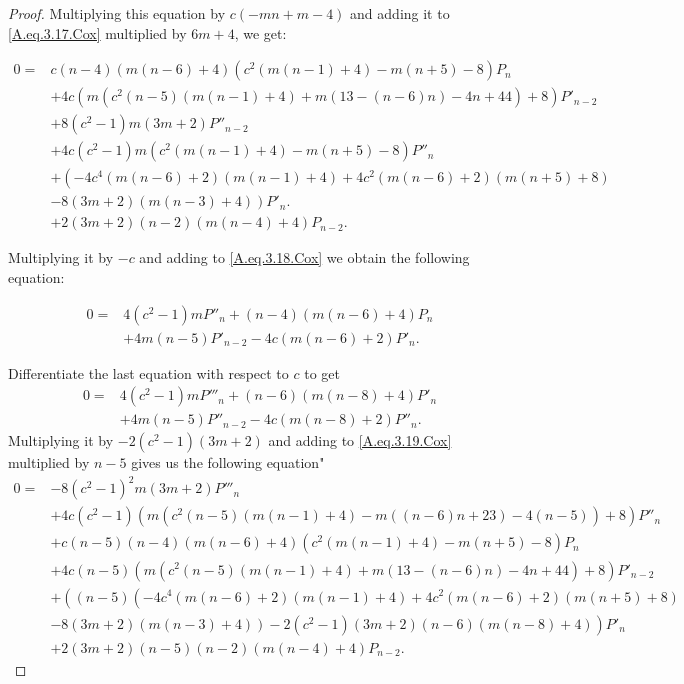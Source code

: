 \documentclass[review,nopreprintline]{elsarticle}
\theoremstyle{definition}
\numberwithin{equation}{section}
\theoremstyle{remark}
\begin{document}
\begin{proof}
	       Multiplying this equation by $c (-m n+m-4)$ and adding it to  \eqref{A.eq.3.17.Cox} multiplied 
	       by $6 m+4$, we get:
	     
	        \begin{align}
	            0=&c (n-4) (m (n-6)+4) \left(c^2 (m (n-1)+4)-m (n+5)-8\right) P_n \nonumber\\
	            &+4 c \left(m \left(c^2 (n-5) (m (n-1)+4)+m (13-(n-6) n)-4 n+44\right)+8\right) P'_{n-2} \nonumber\\
	            &+8 \left(c^2-1\right) m (3 m+2) P''_{n-2} \nonumber\\
	            &+4 c \left(c^2-1\right) m \left(c^2 (m (n-1)+4)-m (n+5)-8\right) P''_n \nonumber\\
	            &+\left(-4 c^4 (m (n-6)+2) (m (n-1)+4)+4 c^2 (m (n-6)+2) (m (n+5)+8)\right.\nonumber\\
	            &\left.-8 (3 m+2) (m (n-3)+4)\right)  P'_n .\nonumber\\
	            &+2 (3 m+2) (n-2) (m (n-4)+4) P_{n-2}. \label{A.eq.3.19.Cox}
	        \end{align}
	       
	Multiplying it by $-c$ and adding  to \eqref{A.eq.3.18.Cox} we obtain the following equation:
	     
	        \begin{align}
	            0=&4 \left(c^2-1\right) m P''_n +(n-4) (m (n-6)+4) P_n \nonumber \\
	            &+4 m (n-5) P'_{n-2} -4 c (m (n-6)+2)  P'_n. \label{A.eq.3.20.Cox}
	        \end{align}
	        
	        Differentiate the last equation with respect to $c$ to get
	        \begin{align}
	            0=&4 \left(c^2-1\right) m P'''_n +(n-6) (m (n-8)+4)  P'_n \nonumber \\
	            &+4 m (n-5) P''_{n-2} -4 c (m (n-8)+2) P''_n. \label{A.eq.3.21.Cox}
	        \end{align}
	        Multiplying it by $-2 \left(c^2-1\right) (3 m+2)$ and adding to  \eqref{A.eq.3.19.Cox} multiplied by $n-5$  gives us the following equation"
	        \begin{align*}
	            0=&-8 \left(c^2-1\right)^2 m (3 m+2) P'''_n \\
	            &+4 c \left(c^2-1\right) \left(m \left(c^2 (n-5) (m (n-1)+4)-m ((n-6) n+23)-4 (n-5)\right)+8\right) P''_n \\
	            &+c (n-5) (n-4) (m (n-6)+4) \left(c^2 (m (n-1)+4)-m (n+5)-8\right) P_n \\
	            &+4 c (n-5) \left(m \left(c^2 (n-5) (m (n-1)+4)+m (13-(n-6) n)-4 n+44\right)+8\right) P'_{n-2} \\
	            &+\left((n-5) \left(-4 c^4 (m (n-6)+2) (m (n-1)+4)+4 c^2 (m (n-6)+2) (m (n+5)+8)\right.\right.\\
	            &\left.\left.-8 (3 m+2) (m (n-3)+4)\right)-2 \left(c^2-1\right) (3 m+2) (n-6) (m (n-8)+4)\right)  P'_n \\
	            &+2 (3 m+2) (n-5) (n-2) (m (n-4)+4) P_{n-2}.
	        \end{align*}
	        

\end{proof}
\end{document}
